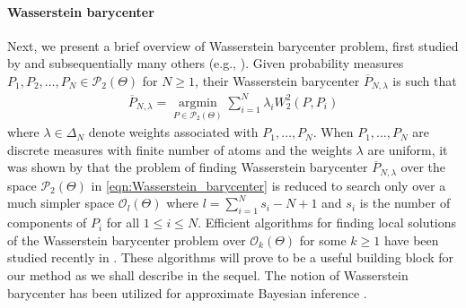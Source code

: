 \paragraph{Wasserstein barycenter}
Next, we present a brief overview of Wasserstein barycenter problem, first
studied by \citep{Carlier-2011} and subsequentially many others (e.g., \citep{Benamou-15, Solomon-15, Alvarez-16}). 
Given probability measures 
$P_{1}, P_{2}, \ldots, P_{N} \in \mathcal{P}_{2}(\Theta)$ for $N \geq 1$, their 
Wasserstein barycenter $\overline{P}_{N,\lambda}$ is such that
\vspace{-6pt}
\begin{eqnarray}
\overline{P}_{N,\lambda}=\mathop {\arg \min}\limits_{P \in \mathcal{P}_{2}(\Theta)}{\sum \limits_{i=1}^{N}{\lambda_{i}W_{2}^{2}(P,P_{i})}} \label{eqn:Wasserstein_barycenter}
\end{eqnarray} 
where $\lambda \in \Delta_{N}$ denote weights associated with $P_{1},\ldots,P_{N}$.
When $P_{1},\ldots, P_{N}$ are discrete measures with finite number of atoms and the 
weights $\lambda$ are uniform, it was shown by \citep{Anderes-2015}
that the problem of finding Wasserstein barycenter $\overline{P}
_{N,\lambda}$ over the space $\mathcal{P}_{2}(\Theta)$ in 
\eqref{eqn:Wasserstein_barycenter} is reduced to search only over a much simpler space 
$\mathcal{O}_{l}(\Theta)$ 
where $l=\sum \limits_{i=1}
^{N}{s_{i}-N+1}$ and $s_{i}$ is the number of components of $P_{i}$ for all $1 \leq i \leq 
N$. 
Efficient algorithms for finding local solutions of the Wasserstein barycenter problem 
over $\mathcal{O}_{k}(\Theta)$ for some $k \geq 1$ have been studied recently in 
\citep{Cuturi-2014}. These algorithms will prove to be a useful building block for 
our method as we shall describe in the sequel. 
The notion of Wasserstein barycenter has been utilized for approximate Bayesian inference
\citep{Sanvesh-aistats}.

